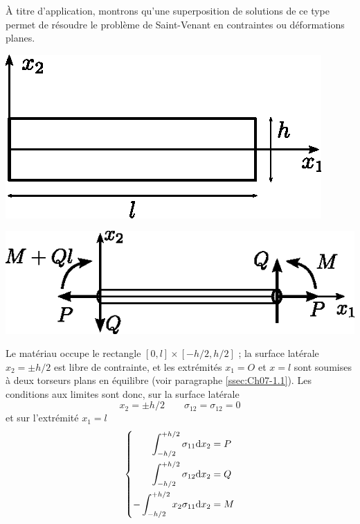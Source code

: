 À titre d'application, montrons qu'une superposition de solutions de ce type permet de résoudre le problème de Saint-Venant en contraintes ou déformations planes. 
\begin{multicols}{2}
    \begin{center}
        \includegraphics{../images/T1_Ch08-02a}
    \end{center}
    \columnbreak
    \begin{center}
        \includegraphics{../images/T1_Ch08-02b}
    \end{center}
\end{multicols}
Le matériau occupe le rectangle $\left[0,l\right] \times\left [-h/2,h/2\right]$ ; la surface latérale $x_2=\pm h/2$ est libre de contrainte, et les extrémités $x_1=O$ et $x = l$ sont soumises à deux torseurs plans en équilibre (voir paragraphe \ref{ssec:Ch07-1.1}). 
Les conditions aux limites sont donc, sur la surface latérale 
\begin{equation}
  x_2 = \pm h/2 \qquad \sigma_{12} = \sigma_{12} = 0
    \label{eq:Ch08-040}
\end{equation}
et sur l'extrémité $x_1 = l$ 
\begin{equation}
  \left\{
  \begin{aligned}
     \int^{+h/2}_{-h/2}     \sigma_{11} \mathrm{d} x_2 & = P \\
     \int^{+h/2}_{-h/2}     \sigma_{12} \mathrm{d} x_2 & = Q \\
    -\int^{+h/2}_{-h/2} x_2 \sigma_{11} \mathrm{d} x_2 & = M
  \end{aligned}
  \right.
    \label{eq:Ch08-041}
\end{equation}
